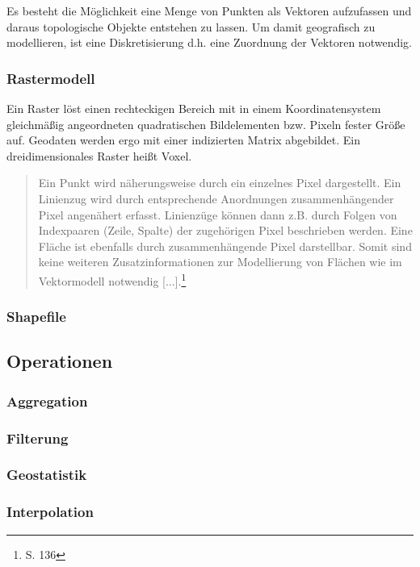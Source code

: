 Es besteht die Möglichkeit eine Menge von Punkten als Vektoren aufzufassen und daraus topologische Objekte entstehen zu lassen.
Um damit geografisch zu modellieren, ist eine Diskretisierung d.h. eine Zuordnung der Vektoren notwendig. 

\subsubsection{Rastermodell}

Ein Raster löst einen rechteckigen Bereich mit in einem Koordinatensystem gleichmäßig angeordneten quadratischen Bildelementen bzw. Pixeln fester Größe auf.
Geodaten werden ergo mit einer indizierten Matrix abgebildet.
Ein dreidimensionales Raster heißt Voxel.
\begin{quote}
Ein Punkt wird näherungsweise durch ein einzelnes Pixel dargestellt. Ein Linienzug wird durch entsprechende Anordnungen zusammenhängender Pixel angenähert erfasst. Linienzüge können dann z.B. durch Folgen von Indexpaaren (Zeile, Spalte) der zugehörigen Pixel beschrieben werden. Eine Fläche ist ebenfalls durch zusammenhängende Pixel darstellbar. Somit sind keine weiteren Zusatzinformationen zur Modellierung von Flächen wie im Vektormodell notwendig [...].\footnote{\cite{book:gi-theopluspraxis3} S. 136}
\end{quote}


\subsubsection{Shapefile}

\subsection{Operationen}

\subsubsection{Aggregation}

\subsubsection{Filterung}

\subsubsection{Geostatistik}

\subsubsection{Interpolation}

